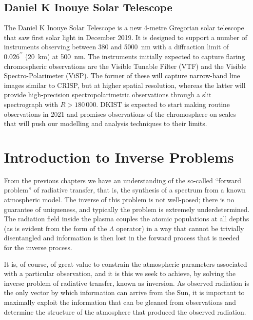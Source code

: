 \subsection{Daniel K Inouye Solar Telescope}

The Daniel K Inouye Solar Telescope \citep[DKIST, ][]{Rimmele2020} is a new 4-metre Gregorian solar telescope that saw first solar light in December 2019.
It is designed to support a number of instruments observing between 380 and \SI{5000}{\nano\metre} with a diffraction limit of $0.026^{\prime\prime}$ (\SI{20}{\kilo\metre}) at \SI{500}{\nano\metre}.
The instruments initially expected to capture flaring chromospheric observations are the Visible Tunable Filter (VTF) and the Visible Spectro-Polarimeter (ViSP).
The former of these will capture narrow-band line images similar to CRISP, but at higher spatial resolution, whereas the latter will provide high-precision spectropolarimetric observations through a slit spectrograph with $R>180\,000$.
DKIST is expected to start making routine observations in 2021 and promises observations of the chromosphere on scales that will push our modelling and analysis techniques to their limits.

\section{Introduction to Inverse Problems}\label{Sec:InverseProblems}

From the previous chapters we have an understanding of the so-called ``forward problem'' of radiative transfer, that is, the synthesis of a spectrum from a known atmospheric model.
The inverse of this problem is not well-posed; there is no guarantee of uniqueness, and typically the problem is extremely underdetermined.
The radiation field inside the plasma couples the atomic populations at all depths (as is evident from the form of the $\Lambda$ operator) in a way that cannot be trivially disentangled and information is then lost in the forward process that is needed for the inverse process.

It is, of course, of great value to constrain the atmospheric parameters associated with a particular observation, and it is this we seek to achieve, by solving the inverse problem of radiative transfer, known as inversion.
As observed radiation is the only vector by which information can arrive from the Sun, it is important to maximally exploit the information that can be gleaned from observations and determine the structure of the atmosphere that produced the observed radiation.

